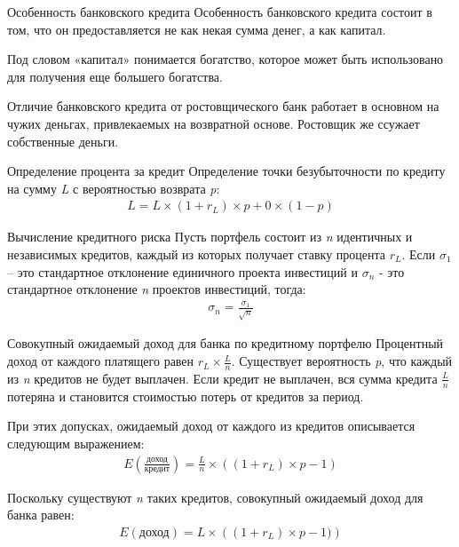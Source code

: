 \documentclass[_Banking_p1.tex]{subfiles}
\begin{document}
\begin{frame}{Особенность банковского кредита}
Особенность банковского кредита состоит в том, что он предоставляется не как некая сумма денег, а как капитал.

Под словом «капитал» понимается богатство, которое может быть использовано для получения еще большего богатства.
\end{frame}

\begin{frame}{Отличие банковского кредита от ростовщического}
банк работает в основном на чужих деньгах, привлекаемых на возвратной основе. Ростовщик же ссужает собственные деньги.
\end{frame}

\begin{frame}{Определение процента за кредит}
Определение точки безубыточности по кредиту на сумму \textit{L }с вероятностью возврата \textit{p}: 
\begin{align}
L=L\times (1+r_L)\times p + 0 \times (1-p)
\end{align}
\end{frame}

\begin{frame}{Вычисление кредитного риска}
Пусть портфель состоит из \textit{n} идентичных и независимых кредитов, каждый из которых получает ставку процента $r_L$.
Если $\sigma_1$ – это стандартное отклонение единичного проекта инвестиций и $\sigma_n$ - это стандартное отклонение \textit{n} проектов инвестиций, тогда:
\begin{align}
\sigma_n=\frac{\sigma_1}{\sqrt{n}}
\end{align}
\end{frame}

\begin{frame}[allowframebreaks]{Совокупный ожидаемый доход для банка по кредитному портфелю}
Процентный доход от каждого платящего равен $r_L \times \frac{L}{n}$. Существует вероятность \textit{p}, что каждый из \textit{n} кредитов не будет выплачен. Если кредит не выплачен, вся сумма кредита $\frac{L}{n}$ потеряна и становится стоимостью потерь от кредитов за период. 

\pagebreak
При этих допусках, ожидаемый доход от каждого из кредитов описывается следующим выражением:
\begin{align}
E\left(\frac{\text{доход}}{\text{кредит}}\right)=\frac{L}{n}\times \left((1+r_L)\times p -1\right)
\end{align}

Поскольку существуют \textit{n} таких кредитов, совокупный ожидаемый доход для банка равен:
\begin{align}
E(\text{доход}) = L \times \left((1 + r_L) \times p - 1)\right)
\end{align}
\end{frame}
\end{document}

